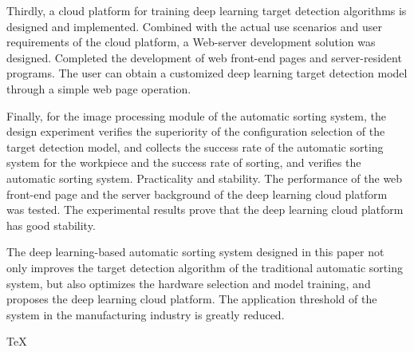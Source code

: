 \begin{englishabstract}
Thirdly, a cloud platform for training deep learning target detection algorithms is designed and implemented. 
Combined with the actual use scenarios and user requirements of the cloud platform, a Web-server development solution was designed. 
Completed the development of web front-end pages and server-resident programs. 
The user can obtain a customized deep learning target detection model through a simple web page operation.

Finally, for the image processing module of the automatic sorting system, 
the design experiment verifies the superiority of the configuration selection of the target detection model, 
and collects the success rate of the automatic sorting system for the workpiece and the success rate of sorting, 
and verifies the automatic sorting system. Practicality and stability. The performance of the web front-end page and the server 
background of the deep learning cloud platform was tested. The experimental results prove that the deep learning cloud platform has good stability.

The deep learning-based automatic sorting system designed in this paper not only improves the target detection algorithm of the traditional automatic 
sorting system, but also optimizes the hardware selection and model training, and proposes the deep learning cloud platform. 
The application threshold of the system in the manufacturing industry is greatly reduced.

\TeX\index{\TeX}


\end{englishabstract}
